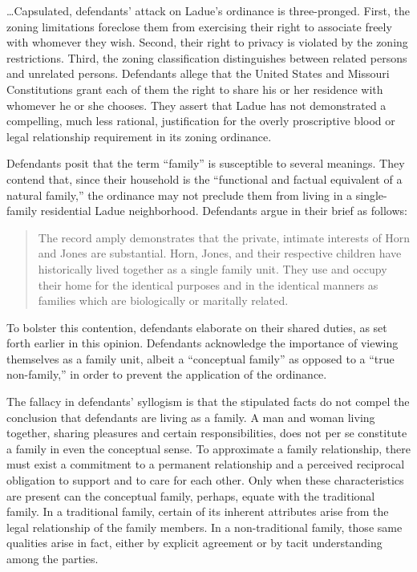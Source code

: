 \ldots Capsulated, defendants' attack on Ladue's ordinance is three-pronged.
First, the zoning limitations foreclose them from exercising their right to
associate freely with whomever they wish. Second, their right to privacy is
violated by the zoning restrictions. Third, the zoning classification
distinguishes between related persons and unrelated persons. Defendants allege
that the United States and Missouri Constitutions grant each of them the right
to share his or her residence with whomever he or she chooses. They assert that
Ladue has not demonstrated a compelling, much less rational, justification for
the overly proscriptive blood or legal relationship requirement in its zoning
ordinance.

Defendants posit that the term ``family'' is susceptible to several meanings.
They contend that, since their household is the ``functional and factual
equivalent of a natural family,'' the ordinance may not preclude them from
living in a single-family residential Ladue neighborhood. Defendants argue in
their brief as follows:
\begin{quote}
The record amply demonstrates that the private, intimate interests of Horn and
Jones are substantial. Horn, Jones, and their respective children have
historically lived together as a single family unit. They use and occupy their
home for the identical purposes and in the identical manners as families which
are biologically or maritally related.
\end{quote}

To bolster this contention, defendants elaborate on their shared duties, as set
forth earlier in this opinion. Defendants acknowledge the importance of viewing
themselves as a family unit, albeit a ``conceptual family'' as opposed to a
``true non-family,'' in order to prevent the application of the
ordinance.

The fallacy in defendants' syllogism is that the stipulated facts do not compel
the conclusion that defendants are living as a family. A man and woman living
together, sharing pleasures and certain responsibilities, does not per se
constitute a family in even the conceptual sense. To approximate a family
relationship, there must exist a commitment to a permanent relationship and a
perceived reciprocal obligation to support and to care for each other. Only when
these characteristics are present can the conceptual family, perhaps, equate
with the traditional family. In a traditional family, certain of its inherent
attributes arise from the legal relationship of the family members. In a
non-traditional family, those same qualities arise in fact, either by explicit
agreement or by tacit understanding among the parties.

